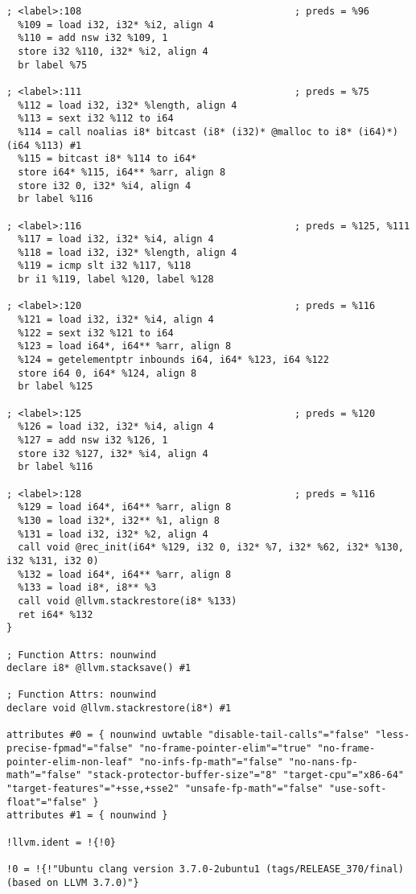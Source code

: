 \begin{verbatim}
; <label>:108                                     ; preds = %96
  %109 = load i32, i32* %i2, align 4
  %110 = add nsw i32 %109, 1
  store i32 %110, i32* %i2, align 4
  br label %75

; <label>:111                                     ; preds = %75
  %112 = load i32, i32* %length, align 4
  %113 = sext i32 %112 to i64
  %114 = call noalias i8* bitcast (i8* (i32)* @malloc to i8* (i64)*)(i64 %113) #1
  %115 = bitcast i8* %114 to i64*
  store i64* %115, i64** %arr, align 8
  store i32 0, i32* %i4, align 4
  br label %116

; <label>:116                                     ; preds = %125, %111
  %117 = load i32, i32* %i4, align 4
  %118 = load i32, i32* %length, align 4
  %119 = icmp slt i32 %117, %118
  br i1 %119, label %120, label %128

; <label>:120                                     ; preds = %116
  %121 = load i32, i32* %i4, align 4
  %122 = sext i32 %121 to i64
  %123 = load i64*, i64** %arr, align 8
  %124 = getelementptr inbounds i64, i64* %123, i64 %122
  store i64 0, i64* %124, align 8
  br label %125

; <label>:125                                     ; preds = %120
  %126 = load i32, i32* %i4, align 4
  %127 = add nsw i32 %126, 1
  store i32 %127, i32* %i4, align 4
  br label %116

; <label>:128                                     ; preds = %116
  %129 = load i64*, i64** %arr, align 8
  %130 = load i32*, i32** %1, align 8
  %131 = load i32, i32* %2, align 4
  call void @rec_init(i64* %129, i32 0, i32* %7, i32* %62, i32* %130, i32 %131, i32 0)
  %132 = load i64*, i64** %arr, align 8
  %133 = load i8*, i8** %3
  call void @llvm.stackrestore(i8* %133)
  ret i64* %132
}

; Function Attrs: nounwind
declare i8* @llvm.stacksave() #1

; Function Attrs: nounwind
declare void @llvm.stackrestore(i8*) #1

attributes #0 = { nounwind uwtable "disable-tail-calls"="false" "less-precise-fpmad"="false" "no-frame-pointer-elim"="true" "no-frame-pointer-elim-non-leaf" "no-infs-fp-math"="false" "no-nans-fp-math"="false" "stack-protector-buffer-size"="8" "target-cpu"="x86-64" "target-features"="+sse,+sse2" "unsafe-fp-math"="false" "use-soft-float"="false" }
attributes #1 = { nounwind }

!llvm.ident = !{!0}

!0 = !{!"Ubuntu clang version 3.7.0-2ubuntu1 (tags/RELEASE_370/final) (based on LLVM 3.7.0)"}
\end{verbatim}